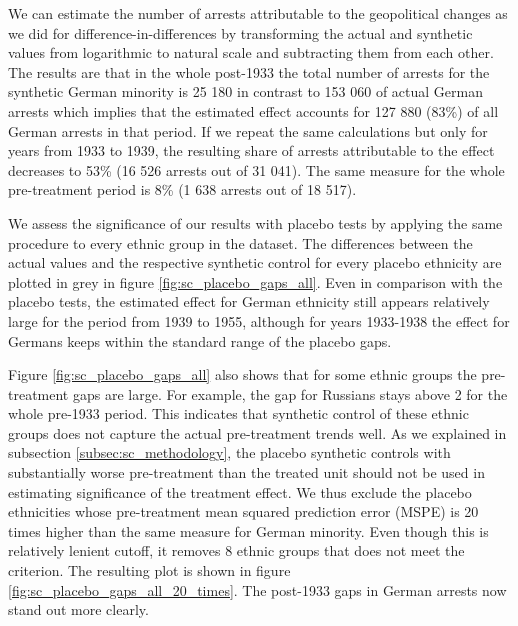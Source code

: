 We can estimate the number of arrests attributable to the geopolitical changes as we did for difference-in-differences by transforming the actual  and synthetic values from logarithmic to natural scale and subtracting  them from each other. The results are   
 that in the whole post-1933 the total number of arrests for the synthetic German minority is  25 180 in contrast to  153 060 of actual German arrests which implies that the estimated effect accounts for 127 880 (83\%) of all German arrests in that period. If we repeat the same calculations but  only for years from 1933 to 1939, 
 the resulting share of arrests attributable to the effect decreases to 53\% (16 526 arrests out of 31 041). The same measure for the whole pre-treatment period is 8\% (1 638 arrests out of 18 517).

We assess the significance of our results with placebo tests by applying the same procedure to every ethnic group in the dataset. The differences between the actual values and the respective synthetic control for every placebo ethnicity are plotted in grey in figure \ref{fig:sc_placebo_gaps_all}. Even in comparison with the placebo tests, 
the estimated effect for German ethnicity  still appears relatively large for the period from 1939 to 1955, although for years 1933-1938 the effect for Germans keeps within the standard range of the placebo gaps.

Figure \ref{fig:sc_placebo_gaps_all} also shows that for some ethnic groups the pre-treatment gaps are large.
 For example, the gap for Russians stays above 2 for the  whole pre-1933 period. 
 This indicates that synthetic control of these ethnic groups does not capture the actual pre-treatment trends well. 
 As we explained in subsection \ref{subsec:sc_methodology}, the placebo synthetic controls  with  substantially  worse pre-treatment than the treated unit should not be 
used in estimating significance of the treatment effect. 
We thus  exclude the placebo ethnicities whose pre-treatment mean squared prediction error (MSPE) is 20 times higher than the same measure for German minority. Even though this is relatively lenient cutoff, it removes  8 ethnic groups that does not meet the criterion. 
The resulting plot is shown in figure \ref{fig:sc_placebo_gaps_all_20_times}. The post-1933 gaps in German arrests now stand out more clearly. %

